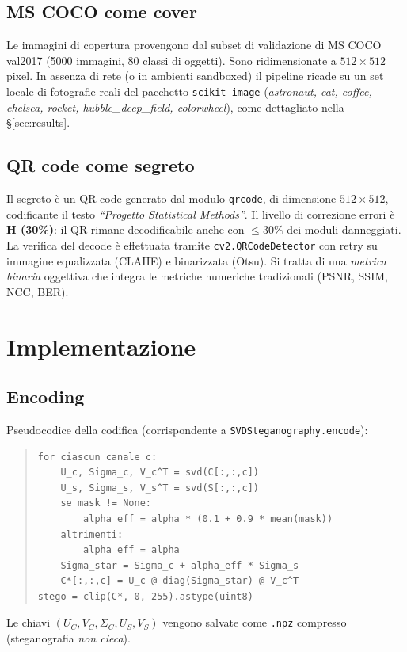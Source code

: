 \documentclass[11pt,a4paper]{article}
\theoremstyle{definition}
\theoremstyle{remark}
\begin{document}
\subsection{MS COCO come cover}
Le immagini di copertura provengono dal subset di validazione di MS
COCO val2017 (5000 immagini, 80 classi di oggetti).  Sono ridimensionate
a $512\times 512$ pixel.  In assenza di rete (o in ambienti
sandboxed) il pipeline ricade su un set locale di fotografie reali del
pacchetto \verb|scikit-image| (\emph{astronaut, cat, coffee, chelsea,
rocket, hubble\_deep\_field, colorwheel}), come dettagliato nella
\S\ref{sec:results}.

\subsection{QR code come segreto}
Il segreto è un QR code generato dal modulo \verb|qrcode|, di
dimensione $512\times 512$, codificante il testo \emph{``Progetto
Statistical Methods''}.  Il livello di correzione errori è
\textbf{H (30\%)}: il QR rimane decodificabile anche con $\leq 30\%$
dei moduli danneggiati.  La verifica del decode è effettuata tramite
\verb|cv2.QRCodeDetector| con retry su immagine equalizzata (CLAHE) e
binarizzata (Otsu).  Si tratta di una \emph{metrica binaria} oggettiva
che integra le metriche numeriche tradizionali (PSNR, SSIM, NCC, BER).


\section{Implementazione}

\subsection{Encoding}
Pseudocodice della codifica (corrispondente a
\verb|SVDSteganography.encode|):
\begin{quote}\small
\begin{verbatim}
for ciascun canale c:
    U_c, Sigma_c, V_c^T = svd(C[:,:,c])
    U_s, Sigma_s, V_s^T = svd(S[:,:,c])
    se mask != None:
        alpha_eff = alpha * (0.1 + 0.9 * mean(mask))
    altrimenti:
        alpha_eff = alpha
    Sigma_star = Sigma_c + alpha_eff * Sigma_s
    C*[:,:,c] = U_c @ diag(Sigma_star) @ V_c^T
stego = clip(C*, 0, 255).astype(uint8)
\end{verbatim}
\end{quote}
Le chiavi $(U_C, V_C, \Sigma_C, U_S, V_S)$ vengono salvate come
\verb|.npz| compresso (steganografia \emph{non cieca}).
\end{document}
